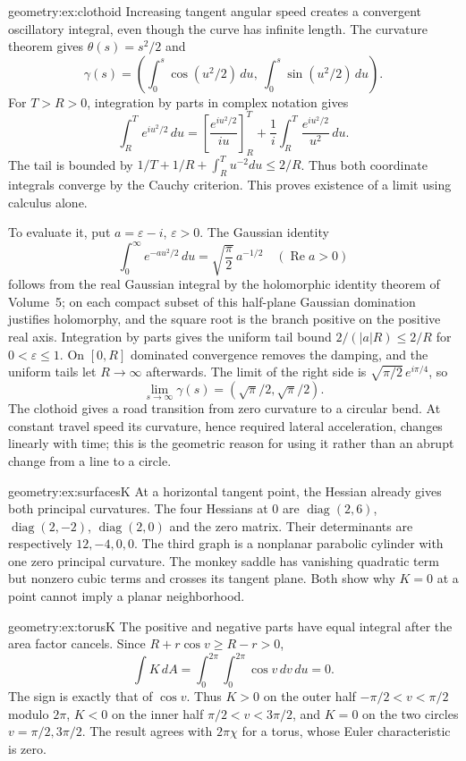 \begin{solution}{geometry:ex:clothoid}
\idea Increasing tangent angular speed creates a convergent oscillatory integral, even though the curve has infinite length.
\writeup The curvature theorem gives $\theta(s)=s^2/2$ and
\[
\gamma(s)=\left(\int_0^s\cos(u^2/2)\,du,\ \int_0^s\sin(u^2/2)\,du\right).
\]
For $T>R>0$, integration by parts in complex notation gives
\[
\int_R^T e^{iu^2/2}\,du
=\left[\frac{e^{iu^2/2}}{iu}\right]_R^T
+\frac1i\int_R^T\frac{e^{iu^2/2}}{u^2}\,du.
\]
The tail is bounded by $1/T+1/R+\int_R^T u^{-2}du\le2/R$. Thus both coordinate integrals converge by the Cauchy criterion. This proves existence of a limit using calculus alone.

To evaluate it, put $a=\varepsilon-i$, $\varepsilon>0$. The Gaussian identity
\[
\int_0^\infty e^{-a u^2/2}\,du=\sqrt{\frac\pi2}\,a^{-1/2}
\quad(\operatorname{Re}a>0)
\]
follows from the real Gaussian integral by the holomorphic identity theorem of Volume~5; on each compact subset of this half-plane Gaussian domination justifies holomorphy, and the square root is the branch positive on the positive real axis. Integration by parts gives the uniform tail bound $2/(|a|R)\le2/R$ for $0<\varepsilon\le1$. On $[0,R]$ dominated convergence removes the damping, and the uniform tails let $R\to\infty$ afterwards. The limit of the right side is $\sqrt{\pi/2}\,e^{i\pi/4}$, so
\[
\lim_{s\to\infty}\gamma(s)=(\sqrt\pi/2,\sqrt\pi/2).
\]
The clothoid gives a road transition from zero curvature to a circular bend. At constant travel speed its curvature, hence required lateral acceleration, changes linearly with time; this is the geometric reason for using it rather than an abrupt change from a line to a circle.
\end{solution}

\begin{solution}{geometry:ex:surfacesK}
\idea At a horizontal tangent point, the Hessian already gives both principal curvatures.
\writeup The four Hessians at $0$ are $\operatorname{diag}(2,6)$, $\operatorname{diag}(2,-2)$, $\operatorname{diag}(2,0)$ and the zero matrix. Their determinants are respectively $12,-4,0,0$. The third graph is a nonplanar parabolic cylinder with one zero principal curvature. The monkey saddle has vanishing quadratic term but nonzero cubic terms and crosses its tangent plane. Both show why $K=0$ at a point cannot imply a planar neighborhood.
\end{solution}

\begin{solution}{geometry:ex:torusK}
\idea The positive and negative parts have equal integral after the area factor cancels.
\writeup Since $R+r\cos v\ge R-r>0$,
\[
\int K\,dA=\int_0^{2\pi}\int_0^{2\pi}\cos v\,dv\,du=0.
\]
The sign is exactly that of $\cos v$. Thus $K>0$ on the outer half $-\pi/2<v<\pi/2$ modulo $2\pi$, $K<0$ on the inner half $\pi/2<v<3\pi/2$, and $K=0$ on the two circles $v=\pi/2,3\pi/2$. The result agrees with $2\pi\chi$ for a torus, whose Euler characteristic is zero.
\end{solution}

